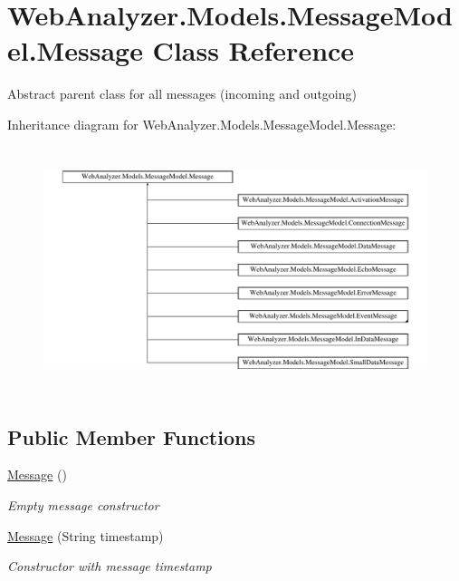 \hypertarget{class_web_analyzer_1_1_models_1_1_message_model_1_1_message}{}\section{Web\+Analyzer.\+Models.\+Message\+Model.\+Message Class Reference}
\label{class_web_analyzer_1_1_models_1_1_message_model_1_1_message}


Abstract parent class for all messages (incoming and outgoing)  


Inheritance diagram for Web\+Analyzer.\+Models.\+Message\+Model.\+Message\+:\begin{figure}[H]
\begin{center}
\leavevmode
\includegraphics[height=7.200000cm]{class_web_analyzer_1_1_models_1_1_message_model_1_1_message}
\end{center}
\end{figure}
\subsection*{Public Member Functions}
\begin{DoxyCompactItemize}
\item 
\hyperlink{class_web_analyzer_1_1_models_1_1_message_model_1_1_message_ad1fc3e795c7af522dbf12792f621abfd}{Message} ()
\begin{DoxyCompactList}\small\item\em Empty message constructor \end{DoxyCompactList}\item 
\hyperlink{class_web_analyzer_1_1_models_1_1_message_model_1_1_message_af05222ad929359946a4ce5d983bf7b22}{Message} (String timestamp)
\begin{DoxyCompactList}\small\item\em Constructor with message timestamp \end{DoxyCompactList}\end{DoxyCompactItemize}
